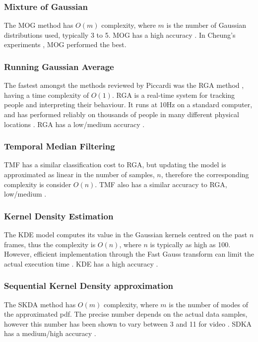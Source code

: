 \subsubsection{Mixture of Gaussian}
The MOG method \cite{Stauffer1999} has $O(m)$ complexity, where $m$ is the number of Gaussian distributions used, typically 3 to 5. MOG has a high accuracy \cite{Piccardi2004}. In Cheung's experiments \cite{Cheung2007}, MOG performed the best.\\

\subsubsection{Running Gaussian Average}
The fastest amongst the methods reviewed by Piccardi was the RGA method \cite{Wren1997,Koller1994}, having a time complexity of $O(1)$. RGA is a real-time system for tracking people and interpreting their behaviour. It runs at 10Hz on a standard computer, and has performed reliably on thousands of people in many
different physical locations \cite{Wren1997}. RGA has a low/medium accuracy \cite{Piccardi2004}.\\

\subsubsection{Temporal Median Filtering}
TMF \cite{Lo2001,Cucchiara2003} has a similar classification cost to RGA, but updating the  model is approximated as linear in the number of samples, $n$, therefore the corresponding complexity is consider $O(n)$. TMF also has a similar accuracy to RGA, low/medium \cite{Piccardi2004}.\\

\subsubsection{Kernel Density Estimation}
The KDE \cite{Elgammal2000} model computes its value in the Gaussian kernels centred on the past $n$ frames, thus the complexity is $O(n)$, where $n$ is typically as high as 100. However, efficient implementation through the Fast Gauss transform can limit the actual execution time \cite{Elgammal2003}. KDE has a high accuracy \cite{Piccardi2004}.\\

\subsubsection{Sequential Kernel Density approximation}
The SKDA \cite{Han2004} method has $O(m)$ complexity, where $m$ is the number of modes of the approximated pdf. 
The precise number depends on the actual data samples, however this number has been shown to vary between 3 and 11 for video \cite{Han2007}. SDKA has a medium/high accuracy \cite{Piccardi2004}.

